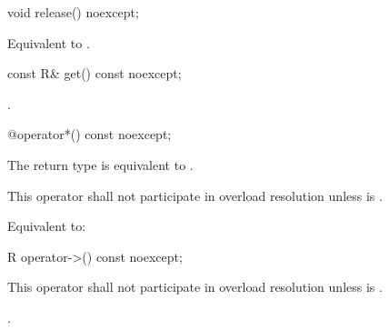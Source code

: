 \documentclass[ebook,11pt,article]{memoir}
\begin{document}

\begin{itemdecl}
void release() noexcept;
\end{itemdecl}

\begin{itemdescr}
\pnum
\effects 
Equivalent to .
\end{itemdescr}


\begin{itemdecl}
const R& get() const noexcept;
\end{itemdecl}

\begin{itemdescr}
\pnum
\returns
{}. %
\end{itemdescr}


\begin{itemdecl}
@\seebelow@ operator*() const noexcept;
\end{itemdecl}

\begin{itemdescr}

\pnum
\requires
The return type is equivalent to 
. 

\pnum
\remarks 
This operator shall not participate in overload resolution unless  is .

\pnum
\effects 
Equivalent to:\\
\end{itemdescr}

\begin{itemdecl}
R operator->() const noexcept;
\end{itemdecl}

\begin{itemdescr}
\pnum
\remarks 
This operator 
shall not participate in overload resolution unless 
is . 

\pnum
\returns {}.
\end{itemdescr}
\end{document}
